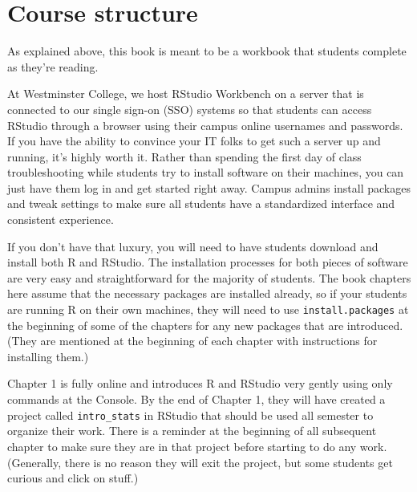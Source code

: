 \documentclass[
]{book}
\begin{document}
\hypertarget{intro-structure}{%
\section*{Course structure}\label{intro-structure}}

As explained above, this book is meant to be a workbook that students complete as they're reading.

At Westminster College, we host RStudio Workbench on a server that is connected to our single sign-on (SSO) systems so that students can access RStudio through a browser using their campus online usernames and passwords. If you have the ability to convince your IT folks to get such a server up and running, it's highly worth it. Rather than spending the first day of class troubleshooting while students try to install software on their machines, you can just have them log in and get started right away. Campus admins install packages and tweak settings to make sure all students have a standardized interface and consistent experience.

If you don't have that luxury, you will need to have students download and install both R and RStudio. The installation processes for both pieces of software are very easy and straightforward for the majority of students. The book chapters here assume that the necessary packages are installed already, so if your students are running R on their own machines, they will need to use \texttt{install.packages} at the beginning of some of the chapters for any new packages that are introduced. (They are mentioned at the beginning of each chapter with instructions for installing them.)

Chapter 1 is fully online and introduces R and RStudio very gently using only commands at the Console. By the end of Chapter 1, they will have created a project called \texttt{intro\_stats} in RStudio that should be used all semester to organize their work. There is a reminder at the beginning of all subsequent chapter to make sure they are in that project before starting to do any work. (Generally, there is no reason they will exit the project, but some students get curious and click on stuff.)
\end{document}
